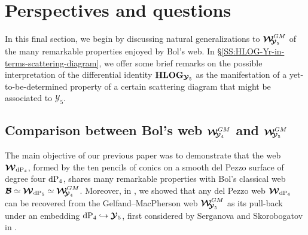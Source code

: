 \documentclass[11pt]{amsart}
\begin{document}
\section{\bf Perspectives and questions}
\label{SS:Perspectives-questions}
In this final section, we begin by discussing natural generalizations to 
$\boldsymbol{\mathcal W}_{\hspace{-0.1cm} \boldsymbol{\mathcal Y}_5}^{GM}$
 of the many remarkable properties enjoyed by Bol's web. In \S\ref{SS:HLOG-Yr-in-terms-scattering-diagram}, we offer some brief remarks on the possible interpretation of the differential identity ${\bf HLOG}_{\boldsymbol{\mathcal Y}_5}$ as the manifestation of a yet-to-be-determined property of a certain scattering diagram that might be associated to $\boldsymbol{\mathcal Y}_5$.




\subsection{\bf  Comparison between Bol's web $\boldsymbol{\mathcal W}_{\hspace{-0.1cm} \boldsymbol{\mathcal Y}_4}^{GM}$ and $\boldsymbol{\mathcal W}_{\hspace{-0.1cm} \boldsymbol{\mathcal Y}_5}^{GM}$}
\label{SS:Comp}
 The main objective of our previous paper \cite{PirioAFST} was to demonstrate that the web $\boldsymbol{\mathcal W}_{ {\rm dP}_4}$, formed by the ten pencils of conics on a smooth del Pezzo surface of degree four ${\rm dP}_4$, shares many remarkable properties with Bol's classical web $\boldsymbol{\mathcal B}\simeq \boldsymbol{\mathcal W}_{ {\rm dP}_5} \simeq \boldsymbol{\mathcal W}_{\hspace{-0.1cm} \boldsymbol{\mathcal Y}_4}^{GM}$.  Moreover, in  \cite[\S4.5]{PirioAFST}, we showed that any del Pezzo web $\boldsymbol{\mathcal W}_{ {\rm dP}_4}$ can be recovered from the Gelfand--MacPherson web $\boldsymbol{\mathcal W}_{\hspace{-0.1cm} \boldsymbol{\mathcal Y}_5}^{GM}$ as its pull-back under an embedding  ${\rm dP}_4\hookrightarrow \boldsymbol{\mathcal Y}_5$, first considered by Serganova and Skorobogatov in \cite{SerganovaSkorobogatov}. 
 
\end{document}
